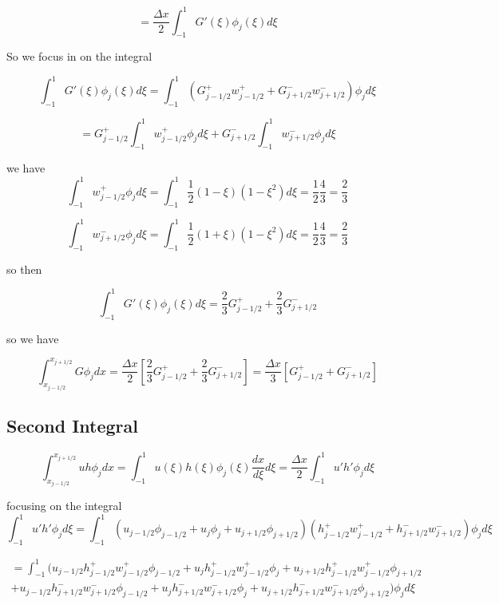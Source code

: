 \documentclass[12pt]{article}
\begin{document}
\[ = \frac{\Delta x}{2} \int_{-1}^{1} G'(\xi)\phi_{j}(\xi)d\xi\]

So we focus in on the integral

\[\int_{-1}^{1} G'(\xi)\phi_{j}(\xi)d\xi = \int_{-1}^{1} \left( G^+_{j-1/2} w^+_{j-1/2} +  G^-_{j+1/2} w^-_{j+1/2}  \right)\phi_{j}d\xi \]

\[= G^+_{j-1/2}\int_{-1}^{1}  w^+_{j-1/2}\phi_{j}d\xi  + G^-_{j+1/2}  \int_{-1}^{1}  w^-_{j+1/2} \phi_{j}d\xi\]

we have 
\[\int_{-1}^{1}  w^+_{j-1/2}\phi_{j}d\xi = \int_{-1}^{1} \frac{1}{2}\left(1 - \xi\right)\left(1 - \xi^2\right)d\xi = \frac{1}{2} \frac{4}{3} = \frac{2}{3}\]

\[\int_{-1}^{1}  w^-_{j+1/2} \phi_{j}d\xi = \int_{-1}^{1} \frac{1}{2}\left(1 + \xi\right)\left(1 - \xi^2\right)d\xi = \frac{1}{2} \frac{4}{3} = \frac{2}{3} \]

so then 

\[\int_{-1}^{1} G'(\xi)\phi_{j}(\xi)d\xi = \frac{2}{3} G^+_{j-1/2}  + \frac{2}{3}G^-_{j+1/2}  \]

so we have 

\[\int_{x_{j-1/2}}^{x_{j+1/2}} G\phi_{j} dx = \frac{\Delta x}{2} \left[\frac{2}{3} G^+_{j-1/2}  + \frac{2}{3}G^-_{j+1/2}\right]  =  \frac{\Delta x}{3} \left[ G^+_{j-1/2}  + G^-_{j+1/2}\right]\]

\subsection{Second Integral}

\[\int_{x_{j-1/2}}^{x_{j+1/2}}  uh \phi_{j} dx =  \int_{-1}^{1}  u(\xi)h(\xi) \phi_{j}(\xi) \frac{d x}{d\xi}d\xi = \frac{\Delta x}{2}\int_{-1}^{1}  u'h' \phi_{j} d\xi\]

focusing on the integral 
\[\int_{-1}^{1}  u'h' \phi_{j} d\xi = \int_{-1}^{1} \left(u_{j-1/2}\phi_{j-1/2} + u_{j}\phi_{j} + u_{j+1/2}\phi_{j+1/2}\right) \left(h^+_{j-1/2} w^+_{j-1/2} +  h^-_{j+1/2} w^-_{j+1/2} \right) \phi_{j} d\xi\]

\begin{multline*}
= \int_{-1}^{1}  \Bigg(u_{j-1/2}h^+_{j-1/2} w^+_{j-1/2}\phi_{j-1/2} + u_{j}h^+_{j-1/2} w^+_{j-1/2}\phi_{j} + u_{j+1/2}h^+_{j-1/2} w^+_{j-1/2}\phi_{j+1/2}  \\ + u_{j-1/2}h^-_{j+1/2} w^-_{j+1/2}\phi_{j-1/2} + u_{j}h^-_{j+1/2} w^-_{j+1/2}\phi_{j} + u_{j+1/2}h^-_{j+1/2} w^-_{j+1/2}\phi_{j+1/2}\Bigg) \phi_{j} d\xi
\end{multline*}
\end{document}
